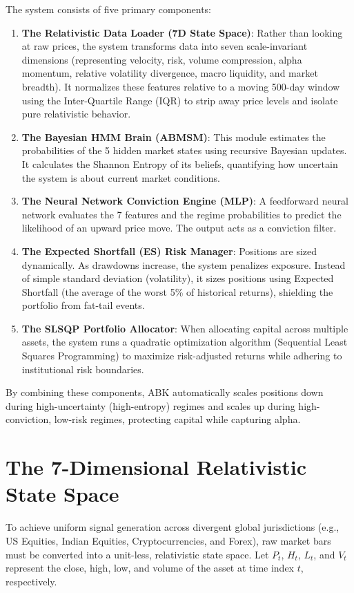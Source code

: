 \documentclass[11pt,a4paper]{article}
\begin{document}
The system consists of five primary components:
\begin{enumerate}
    \item \textbf{The Relativistic Data Loader (7D State Space)}: Rather than looking at raw prices, the system transforms data into seven scale-invariant dimensions (representing velocity, risk, volume compression, alpha momentum, relative volatility divergence, macro liquidity, and market breadth). It normalizes these features relative to a moving 500-day window using the Inter-Quartile Range (IQR) to strip away price levels and isolate pure relativistic behavior.
    \item \textbf{The Bayesian HMM Brain (ABMSM)}: This module estimates the probabilities of the 5 hidden market states using recursive Bayesian updates. It calculates the Shannon Entropy of its beliefs, quantifying how uncertain the system is about current market conditions.
    \item \textbf{The Neural Network Conviction Engine (MLP)}: A feedforward neural network evaluates the 7 features and the regime probabilities to predict the likelihood of an upward price move. The output acts as a conviction filter.
    \item \textbf{The Expected Shortfall (ES) Risk Manager}: Positions are sized dynamically. As drawdowns increase, the system penalizes exposure. Instead of simple standard deviation (volatility), it sizes positions using Expected Shortfall (the average of the worst 5\% of historical returns), shielding the portfolio from fat-tail events.
    \item \textbf{The SLSQP Portfolio Allocator}: When allocating capital across multiple assets, the system runs a quadratic optimization algorithm (Sequential Least Squares Programming) to maximize risk-adjusted returns while adhering to institutional risk boundaries.
\end{enumerate}

By combining these components, ABK automatically scales positions down during high-uncertainty (high-entropy) regimes and scales up during high-conviction, low-risk regimes, protecting capital while capturing alpha.

\newpage
\section{The 7-Dimensional Relativistic State Space}

To achieve uniform signal generation across divergent global jurisdictions (e.g., US Equities, Indian Equities, Cryptocurrencies, and Forex), raw market bars must be converted into a unit-less, relativistic state space. Let $P_t$, $H_t$, $L_t$, and $V_t$ represent the close, high, low, and volume of the asset at time index $t$, respectively.
\end{document}
